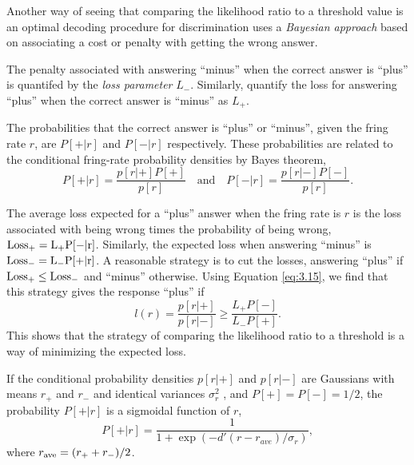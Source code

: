 \begin{rem}
  Another way of seeing that comparing the likelihood ratio to a threshold
value is an optimal decoding procedure for discrimination uses a \emph{Bayesian
approach} based on associating a cost or penalty with getting the wrong answer.
\end{rem}

\begin{defn}
  The penalty associated with answering “minus” when
the correct answer is “plus” is quantifed by the \emph{loss parameter} $L_{-}$. Similarly, quantify the loss for answering “plus” when the correct answer is
“minus” as $L_{+}$.
\end{defn}

\begin{thm}
  The probabilities that the correct answer is
“plus” or “minus”, given the fring rate $r$, are $P[+|r]$ and $P[-|r]$ respectively. These probabilities are related to the conditional fring-rate probability densities by Bayes theorem,
\begin{equation}
  \label{eq:3.15}
  P[+|r]=\frac{p[r|+]P[+]}{p[r]}\quad \text{and}\quad P[-|r]=\frac{p[r|-]P[-]}{p[r]}.
\end{equation}
\end{thm}


\begin{prop}
  The average loss expected for a “plus” answer when the fring rate is $r$ is
the loss associated with being wrong times the probability of being wrong,
$\rm{Loss}_+=L_{+}P[-|r]$. Similarly, the expected loss when answering “minus”
is $\rm{Loss}_-=L_{-}P[+|r]$. A reasonable strategy is to cut the losses, answering
“plus” if $\rm{Loss}_{+}\le \rm{Loss}_{-} $ and “minus”
otherwise. Using Equation
\ref{eq:3.15}, we find that this strategy gives the response
“plus” if
\begin{equation}
  \label{eq:3.16}
  l(r)=\frac{p[r|+]}{p[r|-]}\geq \frac{L_+P[-]}{L_-P[+]}.
\end{equation}
This shows that the strategy of comparing the likelihood ratio to a threshold is a way of minimizing the expected loss.
\end{prop}


\begin{exm}
  If the conditional probability densities $p[r|+]$ and $p[r|-]$ are Gaussians
with means $r_{+}$ and $r_{-}$ and identical variances $\sigma_r^2$ ,
and $P[+]=P[-]=1/2$, the probability $P[+|r]$ is a sigmoidal function
of $r$,
\begin{equation}
  \label{eq:3.17}
  P[+|r]=\frac{1}{1+\exp(-d'(r-r_{ave})/\sigma_r)},
\end{equation}
where $r_{\rm{ave}}=(r_++r_-)/2$.
\end{exm}

